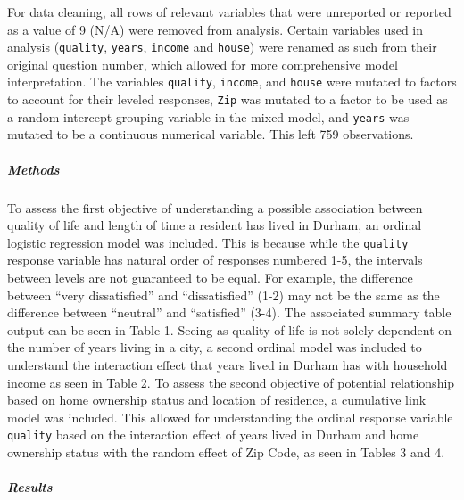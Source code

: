 \documentclass[
  4pt,
]{article}
\begin{document}
For data cleaning, all rows of relevant variables that were unreported
or reported as a value of 9 (N/A) were removed from analysis. Certain
variables used in analysis (\texttt{quality}, \texttt{years},
\texttt{income} and \texttt{house}) were renamed as such from their
original question number, which allowed for more comprehensive model
interpretation. The variables \texttt{quality}, \texttt{income}, and
\texttt{house} were mutated to factors to account for their leveled
responses, \texttt{Zip} was mutated to a factor to be used as a random
intercept grouping variable in the mixed model, and \texttt{years} was
mutated to be a continuous numerical variable. This left 759
observations.

\subparagraph{Methods}\label{methods}

To assess the first objective of understanding a possible association
between quality of life and length of time a resident has lived in
Durham, an ordinal logistic regression model was included. This is
because while the \texttt{quality} response variable has natural order
of responses numbered 1-5, the intervals between levels are not
guaranteed to be equal. For example, the difference between ``very
dissatisfied'' and ``dissatisfied'' (1-2) may not be the same as the
difference between ``neutral'' and ``satisfied'' (3-4). The associated
summary table output can be seen in Table 1. Seeing as quality of life
is not solely dependent on the number of years living in a city, a
second ordinal model was included to understand the interaction effect
that years lived in Durham has with household income as seen in Table 2.
To assess the second objective of potential relationship based on home
ownership status and location of residence, a cumulative link model was
included. This allowed for understanding the ordinal response variable
\texttt{quality} based on the interaction effect of years lived in
Durham and home ownership status with the random effect of Zip Code, as
seen in Tables 3 and 4.

\subparagraph{Results}\label{results}
\end{document}

